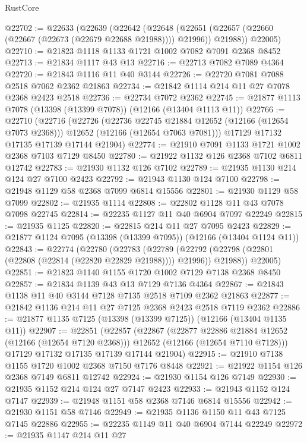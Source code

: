 \begin{lexlean}{RustCore}
\begin{coremodule}
@22702 := @22633
    (@22639
      (@22642
        (@22648 (@22651 (@22657 (@22660 (@22667 (@22673 (@22679 @22688 @21988)))) @21996)) @21988))
      @22005)
@22710 := @21823 @1118 @1133 @1721 @1002 @7082 @7091 @2368 @8452
@22713 := @21834 @1117 @43 @13
@22716 := @22713 @7082 @7089 @4364
@22720 := @21843 @1116 @11 @40 @3144
@22726 := @22720 @7081 @7088 @2518 @7062 @2362 @21863
@22734 := @21842 @1114 @214 @11 @27 @7078 @2368 @2423 @2518
@22736 := @22734 @7072 @2362
@22745 := @21877 @1113 @7078 (@13398 (@13399 @7078)) (@12166 (@13404 @1113 @11))
@22766 := @22710
    (@22716
      (@22726
        (@22736 @22745 @21884 @12652 (@12166 (@12654 @7073 @2368)))
        @12652
        (@12166 (@12654 @7063 @7081)))
      @17129
      @17132
      @17135
      @17139
      @17144
      @21904)
@22774 := @21910 @7091 @1133 @1721 @1002 @2368 @7103 @7129 @8450
@22780 := @21922 @1132 @126 @2368 @7102 @6811 @12742
@22783 := @21930 @1132 @126 @7102
@22789 := @21935 @1130 @214 @124 @27 @7100 @2423
@22792 := @21943 @1130 @124 @7100
@22798 := @21948 @1129 @58 @2368 @7099 @6814 @15556
@22801 := @21930 @1129 @58 @7099
@22802 := @21935 @1114
@22808 := @22802 @1128 @11 @43 @7078 @7098 @22745
@22814 := @22235 @1127 @11 @40 @6904 @7097 @22249
@22815 := @21935 @1125
@22820 := @22815 @214 @11 @27 @7095 @2423
@22829 := @21877 @1124 @7095 (@13398 (@13399 @7095)) (@12166 (@13404 @1124 @11))
@22843 := @22774
    (@22780
      (@22783
        (@22789 (@22792 (@22798 (@22801 (@22808 (@22814 (@22820 @22829 @21988)))) @21996)) @21988))
      @22005)
@22851 := @21823 @1140 @1155 @1720 @1002 @7129 @7138 @2368 @8450
@22857 := @21834 @1139 @43 @13 @7129 @7136 @4364
@22867 := @21843 @1138 @11 @40 @3144 @7128 @7135 @2518 @7109 @2362 @21863
@22877 := @21842 @1136 @214 @11 @27 @7125 @2368 @2423 @2518 @7119 @2362
@22886 := @21877 @1135 @7125 (@13398 (@13399 @7125)) (@12166 (@13404 @1135 @11))
@22907 := @22851
    (@22857
      (@22867
        (@22877 @22886 @21884 @12652 (@12166 (@12654 @7120 @2368)))
        @12652
        (@12166 (@12654 @7110 @7128)))
      @17129
      @17132
      @17135
      @17139
      @17144
      @21904)
@22915 := @21910 @7138 @1155 @1720 @1002 @2368 @7150 @7176 @8448
@22921 := @21922 @1154 @126 @2368 @7149 @6811 @12742
@22924 := @21930 @1154 @126 @7149
@22930 := @21935 @1152 @214 @124 @27 @7147 @2423
@22933 := @21943 @1152 @124 @7147
@22939 := @21948 @1151 @58 @2368 @7146 @6814 @15556
@22942 := @21930 @1151 @58 @7146
@22949 := @21935 @1136 @1150 @11 @43 @7125 @7145 @22886
@22955 := @22235 @1149 @11 @40 @6904 @7144 @22249
@22972 := @21935
    @1147
    @214
    @11
    @27

\end{coremodule}
\end{lexlean}
